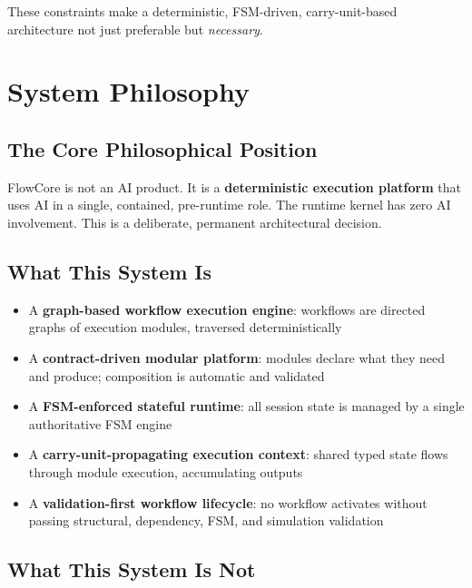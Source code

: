 \documentclass[12pt, a4paper]{report}
\newenvironment{principlebox}[1]{%
  \begin{tcolorbox}[
    colback=blue!4!white,
    colframe=primaryblue,
    title={\textbf{PRINCIPLE: #1}},
    fonttitle=\small\bfseries
  ]
}{%
  \end{tcolorbox}
}
\begin{document}
These constraints make a deterministic, FSM-driven, carry-unit-based architecture not just preferable but \textit{necessary}.

\chapter{System Philosophy}

\section{The Core Philosophical Position}

\begin{principlebox}{The Platform Is a Deterministic Execution Kernel}
FlowCore is not an AI product. It is a \textbf{deterministic execution platform} that uses AI in a single, contained, pre-runtime role. The runtime kernel has zero AI involvement. This is a deliberate, permanent architectural decision.
\end{principlebox}

\section{What This System Is}

\begin{itemize}
  \item A \textbf{graph-based workflow execution engine}: workflows are directed graphs of execution modules, traversed deterministically
  \item A \textbf{contract-driven modular platform}: modules declare what they need and produce; composition is automatic and validated
  \item A \textbf{FSM-enforced stateful runtime}: all session state is managed by a single authoritative FSM engine
  \item A \textbf{carry-unit-propagating execution context}: shared typed state flows through module execution, accumulating outputs
  \item A \textbf{validation-first workflow lifecycle}: no workflow activates without passing structural, dependency, FSM, and simulation validation
\end{itemize}

\section{What This System Is Not}
\end{document}
